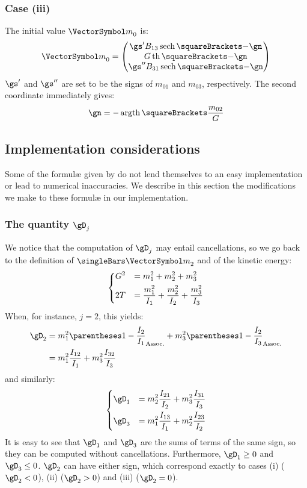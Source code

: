 \documentclass[10pt, a4paper, twoside]{basestyle}
\begin{document}
\subsubsection*{Case (iii)}
The initial value ${\vm}_0$  is:
\[
{\vm}_0 =
\begin{pmatrix}
\gs' B_{13} \HyperbolicSecant\of{-\gn} \\
G \HyperbolicTangent\of{-\gn} \\
\gs'' B_{31} \HyperbolicSecant\of{-\gn}
\end{pmatrix}
\]
$\gs'$ and $\gs''$ are set to be the signs of $m_{01}$ and $m_{03}$, respectively.  The second coordinate immediately gives:
\[
\gn = -\InverseHyperbolicTangent\of{\frac{m_{02}}{G}}
\]

\subsection*{Implementation considerations}
Some of the formul{\ae} given by \cite{Celledoni2007} do not lend themselves to an easy implementation or lead to numerical inaccuracies.  We
describe in this section the modifications we make to these formul{\ae} in our implementation.

\subsubsection*{The quantity $\gD_j$}
We notice that the computation of $\gD_j$ may entail cancellations, so we go back to the definition of $\norm{\vm}$ and of the kinetic energy:
\[
\begin{dcases}
G^2 &= m_1^2 + m_2^2 + m_3^2 \\
2 T &= \frac{m_1^2}{I_1} + \frac{m_2^2}{I_2} + \frac{m_3^2}{I_3}
\end{dcases}
\]
When, for instance, $j = 2$, this yields:
\begin{align*}
\gD_2 &= m_1^2 \pa{1 - \frac{I_2}{I_1}} + m_3^2 \pa{1 - \frac{I_2}{I_3}} \\
&= m_1^2 \frac{I_{12}}{I_1} + m_3^2 \frac{I_{32}}{I_3}
\end{align*}
and similarly:
\[
\begin{dcases}
\gD_1 &= m_2^2 \frac{I_{21}}{I_2} + m_3^2 \frac{I_{31}}{I_3} \\
\gD_3 &= m_1^2 \frac{I_{13}}{I_1} + m_2^2 \frac{I_{23}}{I_2}
\end{dcases}
\]
It is easy to see that $\gD_1$ and $\gD_3$ are the sums of terms of the same sign, so they can be computed without cancellations.  Furthermore,
$\gD_1 \geq 0$ and $\gD_3 \leq 0$.  $\gD_2$ can have either sign, which correspond exactly to cases (i) ($\gD_2 < 0$), (ii) ($\gD_2 > 0$) and 
(iii) ($\gD_2 = 0$).
\end{document}
